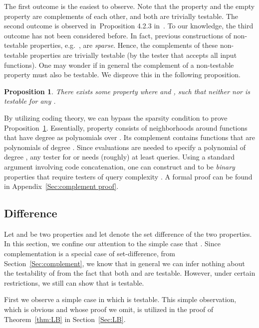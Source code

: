 \documentclass[11pt,english]{article}
\newtheorem{prop}{Proposition}
\theoremstyle{definition}
\theoremstyle{remark}
\begin{document}
The first outcome is the easiest to observe. Note that the property
 and the empty property are complements of each
other, and both are trivially testable. The second outcome is observed
in~Proposition 4.2.3 in~\cite{GGR98}. To our knowledge, the third
outcome has not been considered before. In fact, previous constructions
of non-testable properties, e.g.~\cite{GGR98,BHR05}, are \emph{sparse}.
Hence, the complements of these non-testable properties are trivially
testable (by the tester that accepts all input functions). One may
wonder if in general the complement of a non-testable property must
also be testable. We disprove this in the following proposition. 

\begin{prop}\label{prop:complement}
There exists some property  where 
 and , 
such that neither  nor 
is testable for any .
\end{prop} 

By utilizing coding theory, 
we can bypass the sparsity condition to prove Proposition~\ref{prop:complement}.
Essentially, property  consists of neighborhoods 
around functions that have degree  as polynomials over . 
Its complement contains functions that are polynomials of degree . 
Since  evaluations are needed to specify 
a polynomial of degree , 
any tester for  or  needs (roughly) at least  queries. 
Using a standard argument involving code concatenation, 
one can construct  and  to be 
\emph{binary} properties that require testers of
query complexity . 
A formal proof can be found in Appendix~\ref{Sec:complement proof}.
  
 


\subsection{Difference}

\label{Sec:difference} 
Let  and  be two properties
and let  denote the set difference of
the two properties. In this section, we confine our attention to the
simple case that . Since complementation is
a special case of set-difference, from Section~\ref{Sec:complement},
we know that in general we can infer nothing about the testability
of  from the fact that both  and  are testable.
However, under certain restrictions, we still can show that 
is testable.

First we observe a simple case in which  is
testable. This simple observation, which is obvious and whose proof
we omit, is utilized in the proof of Theorem~\ref{thm:LB} in Section~\ref{Sec:LB}.
\end{document}
